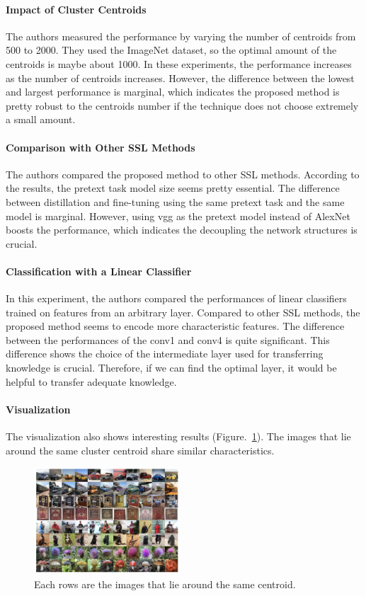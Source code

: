 \documentclass[10pt,twocolumn,letterpaper]{article}
\begin{document}
\paragraph{Impact of Cluster Centroids} 
The authors measured the performance by varying the number of centroids from 500 to 2000. They used the ImageNet dataset, so the optimal amount of the centroids is maybe about 1000. In these experiments, the performance increases as the number of centroids increases. However, the difference between the lowest and largest performance is marginal, which indicates the proposed method is pretty robust to the centroids number if the technique does not choose extremely a small amount.
\vspace{-0.3cm}
\paragraph{Comparison with Other SSL Methods}
The authors compared the proposed method to other SSL methods. According to the results, the pretext task model size seems pretty essential. The difference between distillation and fine-tuning using the same pretext task and the same model is marginal. However, using vgg as the pretext model instead of AlexNet boosts the performance, which indicates the decoupling the network structures is crucial.
\vspace{-0.3cm}
\paragraph{Classification with a Linear Classifier}
In this experiment, the authors compared the performances of linear classifiers trained on features from an arbitrary layer. Compared to other SSL methods, the proposed method seems to encode more characteristic features. The difference between the performances of the conv1 and conv4 is quite significant. This difference shows the choice of the intermediate layer used for transferring knowledge is crucial. Therefore, if we can find the optimal layer, it would be helpful to transfer adequate knowledge.
\vspace{-0.3cm}
\paragraph{Visualization}
The visualization also shows interesting results (Figure.~\ref{fig:vis}). The images that lie around the same cluster centroid share similar characteristics.

 \begin{figure}[b]
	\centering
	\includegraphics[height=4cm]{figures/vis.png}
	\caption{Each rows are the images that lie around the same centroid.}\label{fig:vis}
\end{figure}

{\small

%
}
\end{document}

